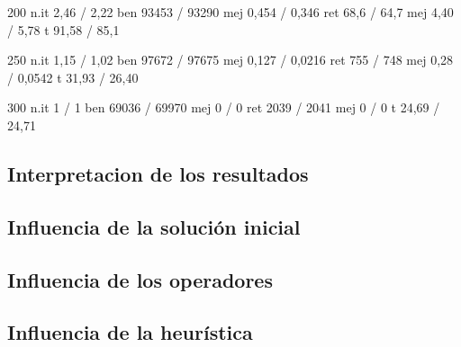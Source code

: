 \documentclass{article}
\begin{document}
200
n.it 2,46 / 2,22
ben 93453 / 93290
mej 0,454 / 0,346
ret 68,6 / 64,7
mej 4,40 / 5,78
t 91,58 / 85,1

250
n.it 1,15 / 1,02
ben 97672 / 97675
mej 0,127 / 0,0216
ret 755 / 748
mej 0,28 / 0,0542
t 31,93 / 26,40

300
n.it 1 / 1
ben 69036 / 69970
mej 0 / 0
ret 2039 / 2041
mej 0 / 0
t 24,69 / 24,71


\subsection{Interpretacion de los resultados}

\subsection{Influencia de la solución inicial}

\subsection{Influencia de los operadores}

\subsection{Influencia de la heurística}
\end{document}
